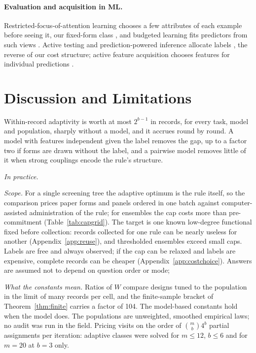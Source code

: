 \documentclass{article}
\begin{document}
\paragraph{Evaluation and acquisition in ML.} Restricted-focus-of-attention learning chooses a few attributes of each example before seeing it, our fixed-form class \citep{bendavid1998}, and budgeted learning fits predictors from such views \citep{cesa2011,hazan2012,lizotte2003,kapoor2005}. Active testing and prediction-powered inference allocate labels \citep{kossen2021,zrnic2024,angelopoulos2023}, the reverse of our cost structure; active feature acquisition chooses features for individual predictions \citep{trapeznikov2013,nan2017,covert2023,vonkleist2025}.

\section{Discussion and Limitations}\label{sec:discussion}
Within-record adaptivity is worth at most $2^{b-1}$ in records, for every task, model and population, sharply without a model, and it accrues round by round. A model with features independent given the label removes the gap, up to a factor two if forms are drawn without the label, and a pairwise model removes little of it when strong couplings encode the rule's structure. \nDiscussionSentence

\emph{In practice.} \nPracticeSentence

\emph{Scope.} For a single screening tree the adaptive optimum is the rule itself, so the comparison prices paper forms and panels ordered in one batch against computer-assisted administration of the rule; for ensembles the cap costs more than pre-commitment (Table~\ref{tab:capgrid}). The target is one known low-degree functional fixed before collection: records collected for one rule can be nearly useless for another (Appendix~\ref{app:reuse}), and thresholded ensembles exceed small caps. Labels are free and always observed; if the cap can be relaxed and labels are expensive, complete records can be cheaper (Appendix~\ref{app:costchoice}). Answers are assumed not to depend on question order or mode; \nOrderSentence{}

\emph{What the constants mean.} Ratios of $W$ compare designs tuned to the population in the limit of many records per cell, and the finite-sample bracket of Theorem~\ref{thm:finite} carries a factor of 104. The model-based constants hold when the model does. The populations are unweighted, smoothed empirical laws; no audit was run in the field. Pricing visits on the order of $\binom mb4^b$ partial assignments per iteration: adaptive classes were solved for $m\le12$, $b\le6$ and for $m=20$ at $b=3$ only.
\end{document}
